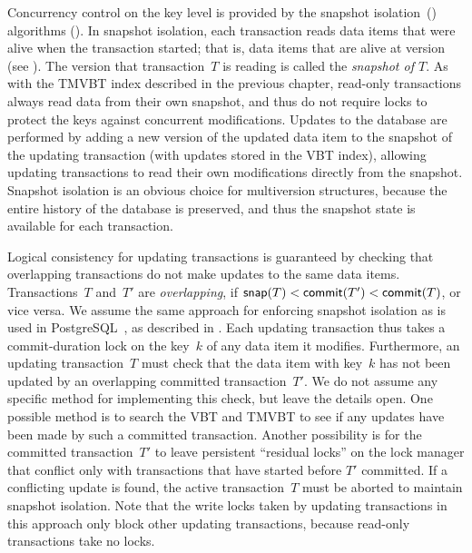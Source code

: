 Concurrency control on the key level is provided by the snapshot
isolation~() algorithms ().
In snapshot isolation, each transaction reads data items that were alive when
the transaction started; that is, data items that are alive at
version~ (see ).
The version that transaction~$T$ is reading is called the \emph{snapshot of
$T$}\@. 
As with the TMVBT index described in the previous chapter, read-only
transactions always read data from their own snapshot, and thus do not
require locks to protect the keys against concurrent modifications.
Updates to the database are performed by adding a new version of the
updated data item to the snapshot of the updating transaction (with updates
stored in the VBT index), allowing updating transactions to read their own
modifications directly from the snapshot.
Snapshot isolation is an obvious choice for multiversion structures,
because the entire history of the database is preserved, and thus
the snapshot state is available for each transaction.

Logical consistency for updating transactions is guaranteed by checking that
overlapping transactions do not make updates to the same data items. 
Transactions~$T$ and~$T'$ are \emph{overlapping}, if 
$\text{\textsf{snap}}(T) < \text{\textsf{commit}}(T') < \text{\textsf{commit}}(T)$, or vice versa.
We assume the same approach for enforcing snapshot isolation as is 
used in PostgreSQL~\cite{alomari:2008:si-cost}, as described in
.
Each updating transaction thus takes a commit-duration lock on the key~$k$ of
any data item it modifies.
Furthermore, an updating transaction~$T$ must check that the data item with
key~$k$ has not been updated by an overlapping committed transaction~$T'$.
We do not assume any specific method for implementing this check, but leave
the details open.
One possible method is to search the VBT and TMVBT to see if any updates have
been made by such a committed transaction.
Another possibility is for the committed transaction~$T'$ to leave persistent
``residual locks'' on the lock manager that conflict only with transactions
that have started before $T'$ committed.
If a conflicting update is found, the active transaction~$T$ must be aborted
to maintain snapshot isolation. 
Note that the write locks taken by updating transactions in this approach
only block other updating transactions, because read-only transactions take
no locks. 

